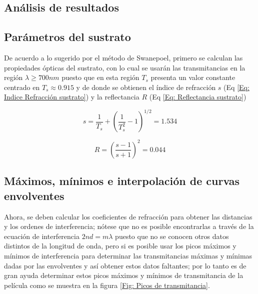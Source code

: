 \documentclass[article]{article}
\begin{document}
\begin{multicols}{2}
    
    \section{Análisis de resultados}
        
        \subsection{Parámetros del sustrato}
    
        De acuerdo a lo sugerido por el método de Swanepoel, primero se calculan las propiedades ópticas del sustrato, con lo cual se usarán las transmitancias en la región $\lambda\geq 700 nm$ puesto que en esta región $T_s$ presenta un valor constante centrado en $T_s\approx 0.915$ y de donde se obtienen el índice de refracción $s$ (Eq \ref{Eq: Indice Refracción sustrato}) y la reflectancia $R$ (Eq \ref{Eq: Reflectancia sustrato})

        \begin{equation}
            s=\frac{1}{T_s}+\left(\frac{1}{T_s^2}-1 \right)^{1/2}=1.534
            \label{Eq: Indice Refracción sustrato}
        \end{equation}

        \begin{equation}
            R=\left(\frac{s-1}{s+1}\right)^2=0.044
        \label{Eq: Reflectancia sustrato}
        \end{equation}
    
        \subsection{Máximos, mínimos e interpolación de curvas envolventes}
    
        Ahora, se deben calcular los coeficientes de refracción para obtener las distancias y los ordenes de interferencia; nótese que no es posible encontrarlas a través de la ecuación de interferencia $2nd=m\lambda$ puesto que no se conocen otros datos distintos de la longitud de onda, pero si es posible usar los picos máximos y mínimos de interferencia para determinar las transmitancias máximas y mínimas dadas por las envolventes y así obtener estos datos faltantes; por lo tanto es de gran ayuda determinar estos picos máximos y mínimos de transmitancia de la película como se muestra en la figura \ref{Fig: Picos de transmitancia}.
    

\end{multicols}
\end{document}
